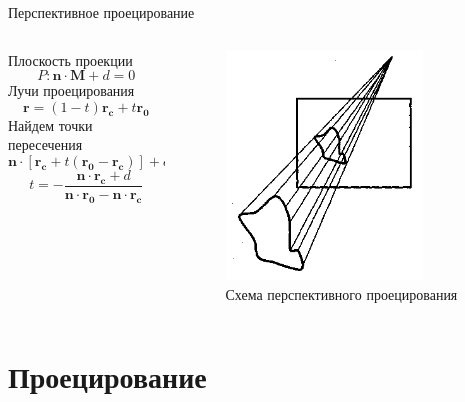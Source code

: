 \documentclass{beamer}
\begin{document}
	\begin{frame}{Перспективное проецирование}

		\begin{columns}
			\begin{column}{0.5\textwidth}
			Плоскость проекции
			\[
				P: \bm{n} \cdot \bm{M} + d = 0	
			\]
			Лучи проецирования
			\[
				\bm{r} = (1-t) \bm{r_c} + t \bm{r_0}	
			\]
			Найдем точки пересечения
			\[
				\bm{n} \cdot [\bm{r_c} +t (\bm{r_0} - \bm{r_c}) ] + d = 0	
			\]
			\[
				t = -
				\frac{\bm{n} \cdot \bm{r_c} + d}{\bm{n} \cdot \bm{r_0} - \bm{n} \cdot \bm{r_c} }
			\]
			\end{column}
			\begin{column}{0.5\textwidth}
				\begin{figure} 
						\includegraphics[width=0.8\textwidth]{images/perspective_projection.png}
					\caption{Схема перспективного проецирования}
				\end{figure}
			\end{column}
		\end{columns}
	\end{frame}

	\section{Проецирование}
\end{document}
